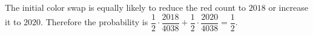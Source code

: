 The initial color swap is equally likely to reduce the red count to $2018$ or increase it to $2020$. Therefore the probability is $\dfrac{1}{2}\cdot\dfrac{2018}{4038}+\dfrac{1}{2}\cdot\dfrac{2020}{4038}=\boxed{\dfrac{1}{2}}$.
